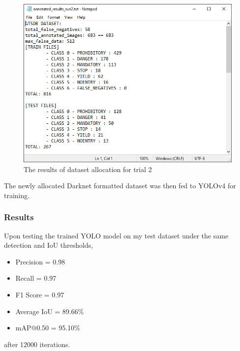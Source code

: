 \documentclass{article}
\begin{document}
            \begin{figure}[h!]
                \centering
                \includegraphics[scale=0.5]{run_2_annotated}
                \caption{The results of dataset allocation for trial 2}
            \end{figure}
        
            The newly allocated Darknet formatted dataset was then fed to YOLOv4 for training.
            
            \subsubsection{Results}
            
            Upon testing the trained YOLO model on my test dataset under the same detection and IoU thresholds, 
            
            \begin{itemize}
                
                \item Precision = 0.98
                \item Recall = 0.97
                \item F1 Score = 0.97
                \item Average IoU = 89.66\%
                \item mAP@0.50 = 95.10\%
                
            \end{itemize}
        
            after 12000 iterations. 
            
\end{document}
